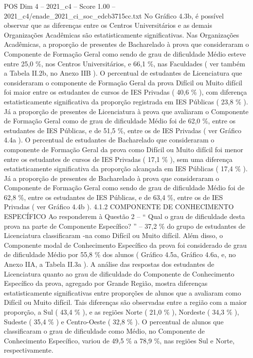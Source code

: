 \begin{textsample}{POS Dim 4 – 2021\_c4 – Score 1.00 – 2021\_c4/enade\_2021\_ci\_soc\_edcb3715cc.txt}
No Gráfico 4.3b, é possível observar que as diferenças entre os Centros Universitários e as demais Organizações Acadêmicas são estatisticamente significativas.
Nas Organizações Acadêmicas, a proporção de presentes de Bacharelado à prova que consideraram o Componente de Formação Geral como sendo de grau de dificuldade Médio esteve entre 25,0 \%, nos Centros Universitários, e 66,1 \%, nas Faculdades ( ver também a Tabela II.2b, no Anexo IIB ).
O percentual de estudantes de Licenciatura que consideraram o componente de Formação Geral da prova Difícil ou Muito difícil foi maior entre os estudantes de cursos de IES Privadas ( 40,6 \% ), com diferença estatisticamente significativa da proporção registrada em IES Públicas ( 23,8 \% ).
Já a proporção de presentes de Licenciatura à prova que avaliaram o Componente de Formação Geral como de grau de dificuldade Médio foi de 62,0 \%, entre os estudantes de IES Públicas, e de 51,5 \%, entre os de IES Privadas ( ver Gráfico 4.4a ).
O percentual de estudantes de Bacharelado que consideraram o componente de Formação Geral da prova como Difícil ou Muito difícil foi menor entre os estudantes de cursos de IES Privadas ( 17,1 \% ), sem uma diferença estatisticamente significativa da proporção alcançada em IES Públicas ( 17,4 \% ).
Já a proporção de presentes de Bacharelado à prova que consideraram o Componente de Formação Geral como sendo de grau de dificuldade Médio foi de 62,8 \%, entre os estudantes de IES Públicas, e de 63,4 \%, entre os de IES Privadas ( ver Gráfico 4.4b ). 4.1.2 COMPONENTE DE CONHECIMENTO ESPECÍFICO Ao responderem à Questão 2 – “ Qual o grau de dificuldade desta prova na parte de Componente Específico? ” – 37,2 \% do grupo de estudantes de Licenciatura classificaram -na como Difícil ou Muito difícil.
Além disso, o Componente modal de Conhecimento Específico da prova foi considerado de grau de dificuldade Médio por 55,8 \% dos alunos ( Gráfico 4.5a, Gráfico 4.6a, e, no Anexo IIA, a Tabela II.3a ).
A análise das respostas dos estudantes de Licenciatura quanto ao grau de dificuldade do Componente de Conhecimento Específico da prova, agregado por Grande Região, mostra diferenças estatisticamente significativas entre proporções de alunos que a avaliaram como Difícil ou Muito difícil.
Tais diferenças são observadas entre a região com a maior proporção, a Sul ( 43,4 \% ), e as regiões Norte ( 21,0 \% ), Nordeste ( 34,3 \% ), Sudeste ( 35,4 \% ) e Centro-Oeste ( 32,8 \% ).
O percentual de alunos que classificaram o grau de dificuldade como Médio, no Componente de Conhecimento Específico, variou de 49,5 \% a 78,9 \%, nas regiões Sul e Norte, respectivamente.

\end{textsample}
